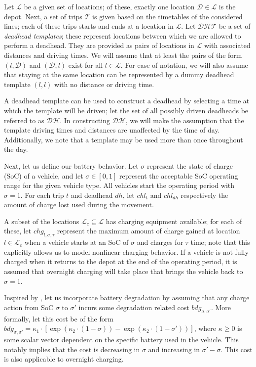 \documentclass[]{article}
\begin{document}
Let $\mathcal{L}$ be a given set of locations; of these, exactly one location $\mathcal{D} \in \mathcal{L}$ is the depot. Next, a set of trips $\mathcal{T}$ is given based on the timetables of the considered lines; each of these trips starts and ends at a location in $\mathcal{L}$. Let $\mathcal{DHT}$ be a set of \emph{deadhead templates}; these represent locations between which we are allowed to perform a deadhead. They are provided as pairs of locations in $\mathcal{L}$ with associated distances and driving times. We will assume that at least the pairs of the form $(l, \mathcal{D})$ and $(\mathcal{D}, l)$ exist for all $l \in \mathcal{L}$. For ease of notation, we will also assume that staying at the same location can be represented by a dummy deadhead template $(l, l)$ with no distance or driving time. 

A deadhead template can be used to construct a deadhead by selecting a time at which the template will be driven; let the set of all possibly driven deadheads be referred to as $\mathcal{DH}$. In constructing $\mathcal{DH}$, we will make the assumption that the template driving times and distances are unaffected by the time of day. Additionally, we note that a template may be used more than once throughout the day. 

Next, let us define our battery behavior. Let $\sigma$ represent the state of charge (SoC) of a vehicle, and let $\sigma \in [0, 1]$ represent the acceptable SoC operating range for the given vehicle type. All vehicles start the operating period with $\sigma=1$. For each trip $t$ and deadhead $dh$, let $chl_t$ and $chl_{dh}$ respectively the amount of charge lost used during the movement. 

A subset of the locations $\mathcal{L}_c \subseteq \mathcal{L}$ has charging equipment available; for each of these, let $chg_{l,\sigma,\tau}$ represent the maximum amount of charge gained at location $l \in \mathcal{L}_c$ when a vehicle starts at an SoC of $\sigma$ and charges for $\tau$ time; note that this explicitly allows us to model nonlinear charging behavior. If a vehicle is not fully charged when it returns to the depot at the end of the operating period, it is assumed that overnight charging will take place that brings the vehicle back to $\sigma=1$. 

Inspired by \citet{vanKootenNiekerk2017}, let us incorporate battery degradation by assuming that any charge action from SoC $\sigma$ to $\sigma'$ incurs some degradation related cost $bdg_{\sigma,\sigma'}$. More formally, let this cost be of the form $bdg_{\sigma,\sigma'} = \kappa_1 \cdot [\exp(\kappa_2 \cdot (1 - \sigma)) - \exp(\kappa_2 \cdot (1 - \sigma'))]$, where $\kappa \geq 0$ is some scalar vector dependent on the specific battery used in the vehicle. This notably implies that the cost is decreasing in $\sigma$ and increasing in $\sigma' - \sigma$. This cost is also applicable to overnight charging.
\end{document}
